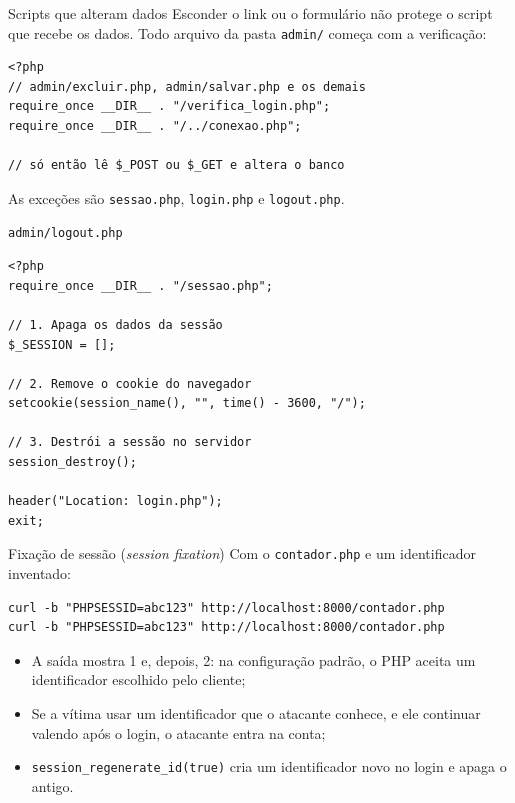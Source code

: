 \documentclass{beamer}
\begin{document}
\begin{frame}[fragile]{Scripts que alteram dados}
	Esconder o link ou o formulário não protege o script que recebe os dados.
	Todo arquivo da pasta \texttt{admin/} começa com a verificação:

	\begin{verbatim}
<?php
// admin/excluir.php, admin/salvar.php e os demais
require_once __DIR__ . "/verifica_login.php";
require_once __DIR__ . "/../conexao.php";

// só então lê $_POST ou $_GET e altera o banco
	\end{verbatim}

	As exceções são \texttt{sessao.php}, \texttt{login.php} e
	\texttt{logout.php}.
\end{frame}

\begin{frame}[fragile]{\texttt{admin/logout.php}}
	\begin{verbatim}
<?php
require_once __DIR__ . "/sessao.php";

// 1. Apaga os dados da sessão
$_SESSION = [];

// 2. Remove o cookie do navegador
setcookie(session_name(), "", time() - 3600, "/");

// 3. Destrói a sessão no servidor
session_destroy();

header("Location: login.php");
exit;
	\end{verbatim}
\end{frame}

\begin{frame}[fragile]{Fixação de sessão (\emph{session fixation})}
	Com o \texttt{contador.php} e um identificador inventado:
	\begin{verbatim}
curl -b "PHPSESSID=abc123" http://localhost:8000/contador.php
curl -b "PHPSESSID=abc123" http://localhost:8000/contador.php
	\end{verbatim}

	\begin{itemize}
		\item A saída mostra 1 e, depois, 2: na configuração padrão, o PHP aceita
		      um identificador escolhido pelo cliente;
		\item Se a vítima usar um identificador que o atacante conhece, e ele
		      continuar valendo após o login, o atacante entra na conta;
		\item \texttt{session\_regenerate\_id(true)} cria um identificador novo no
		      login e apaga o antigo.
	\end{itemize}
\end{frame}
\end{document}
